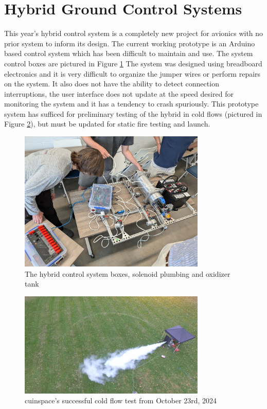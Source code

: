 \part{Hybrid Ground Control Systems}

This year's hybrid control system is a completely new project for avionics with no prior system to inform its design.
The current working prototype is an Arduino based control system which has been difficult to maintain and use. The
system control boxes are pictured in Figure \ref{fig:desk-hybrid} The system was designed using breadboard electronics
and it is very difficult to organize the jumper wires or perform repairs on the system. It also does not have the
ability to detect connection interruptions, the user interface does not update at the speed desired for monitoring the
system and it has a tendency to crash spuriously. This prototype system has sufficed for preliminary testing of the
hybrid in cold flows (pictured in Figure \ref{fig:cold-flowing}), but must be updated for static fire testing and
launch.

\begin{figure}[H]
    \centering
    \includegraphics[width=3.5in]{assets/images/desk-hybrid.jpg}
    \caption{The hybrid control system boxes, solenoid plumbing and oxidizer tank}
    \label{fig:desk-hybrid}
\end{figure}

\begin{figure}[H]
    \centering
    \includegraphics[width=3.5in]{assets/images/cold-flowing.jpg}
    \caption{\Gls{cuinspace}'s successful cold flow test from October 23rd, 2024 \cite{yuhan-footage}}
    \label{fig:cold-flowing}
\end{figure}

